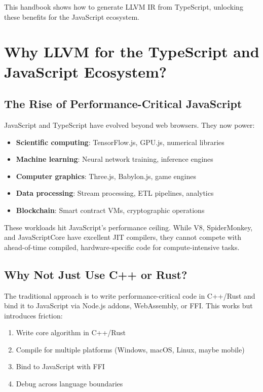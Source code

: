 \documentclass[11pt,oneside]{book}
\begin{document}
This handbook shows how to generate LLVM IR from TypeScript, unlocking these benefits for the JavaScript ecosystem.

\chapter{Why LLVM for the TypeScript and JavaScript Ecosystem?}

\section{The Rise of Performance-Critical JavaScript}

JavaScript and TypeScript have evolved beyond web browsers. They now power:

\begin{itemize}[noitemsep]
  \item \textbf{Scientific computing}: TensorFlow.js, GPU.js, numerical libraries
  \item \textbf{Machine learning}: Neural network training, inference engines
  \item \textbf{Computer graphics}: Three.js, Babylon.js, game engines
  \item \textbf{Data processing}: Stream processing, ETL pipelines, analytics
  \item \textbf{Blockchain}: Smart contract VMs, cryptographic operations
\end{itemize}

These workloads hit JavaScript's performance ceiling. While V8, SpiderMonkey, and JavaScriptCore have excellent JIT compilers, they cannot compete with ahead-of-time compiled, hardware-specific code for compute-intensive tasks.

\section{Why Not Just Use C++ or Rust?}

The traditional approach is to write performance-critical code in C++/Rust and bind it to JavaScript via Node.js addons, WebAssembly, or FFI. This works but introduces friction:

\begin{enumerate}[noitemsep]
  \item Write core algorithm in C++/Rust
  \item Compile for multiple platforms (Windows, macOS, Linux, maybe mobile)
  \item Bind to JavaScript with FFI
  \item Debug across language boundaries
\end{enumerate}
\end{document}
